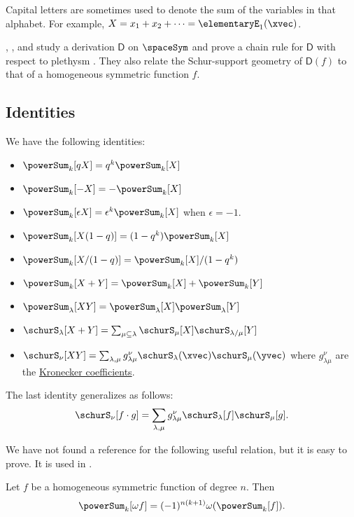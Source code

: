 Capital letters are sometimes used to denote the sum of the variables in that alphabet.
For example, $X = x_1+x_2+\dotsb = \elementaryE_1(\xvec)$.

, , and
 study a derivation $\mathsf{D}$ on $\spaceSym$ and
prove a chain rule for $\mathsf{D}$ with respect to plethysm
\cite{DAndreaFatighentiOnorati2025x}.  They also relate the Schur-support
geometry of $\mathsf{D}(f)$ to that of a homogeneous symmetric function $f$.


\subsection[plethysmIdentities]{Identities}

We have the following identities:
\begin{itemize}
\item $\powerSum_{k}[qX] = q^k\powerSum_{k}[X]$
\item $\powerSum_{k}[-X] = -\powerSum_{k}[X]$
\item $\powerSum_{k}[\epsilon X] = \epsilon^k \powerSum_{k}[X]$ when $\epsilon=-1$.
\item $\powerSum_{k}[X(1-q)] = (1-q^k)\powerSum_{k}[X]$
\item $\powerSum_{k}[X/(1-q)] = \powerSum_{k}[X]/(1-q^k)$
\item $\powerSum_{k}[X+Y] = \powerSum_{k}[X]+\powerSum_{k}[Y]$
\item $\powerSum_{\lambda}[XY] = \powerSum_{\lambda}[X]\powerSum_{\lambda}[Y]$
\item $\schurS_{\lambda}[X+Y] = \sum_{\mu \subseteq \lambda} \schurS_{\mu}[X]\schurS_{\lambda/\mu}[Y]$
\item
$\schurS_\nu[XY] = \sum_{\lambda,\mu} g^{\nu}_{\lambda\mu} \schurS_\lambda(\xvec) \schurS_\mu(\yvec)$
where $g^{\nu}_{\lambda\mu}$ are the \hyperref[schurKroneckerCoefficients]{Kronecker coefficients}.
\end{itemize}
The last identity generalizes as follows:
\[
\schurS_\nu[f\cdot g] = \sum_{\lambda,\mu} g^{\nu}_{\lambda\mu} \schurS_\lambda[f] \schurS_\mu[g].
\]


We have not found a reference for the following useful relation, but it is
easy to prove.  It is used in \cite{AlexanderssonUhlin2020}.
\begin{proposition}[Alexandersson, 2019]
Let $f$ be a homogeneous symmetric function of degree $n$.
Then
\[
\powerSum_k[ \omega f ] = (-1)^{n(k+1)}\omega(\powerSum_k[ f ]).
\]
\end{proposition}


